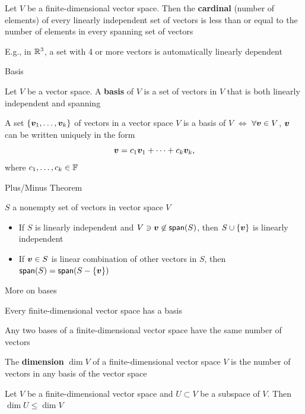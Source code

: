 \documentclass[aspectratio=169]{beamer}
\begin{document}
\begin{frame}
	\begin{theorem}
		Let $V$ be a finite-dimensional vector space. Then the \textbf{cardinal} (number of elements) of every linearly independent set of vectors is less than or equal to the number of elements in every spanning set of vectors
	\end{theorem}
\vfill
E.g., in $\mathbb{R}^3$, a set with 4 or more vectors is automatically linearly dependent
\end{frame}


\begin{frame}{Basis}
	\begin{definition}[Basis]
		Let $V$ be a vector space. A \textbf{basis} of $V$ is a set of vectors in $V$ that is both linearly independent and spanning
	\end{definition}
	\vfill
	\begin{theorem}
		A set $\{\bm{v}_1,\ldots,\bm{v}_k\}$ of vectors in a vector space $V$ is a basis of $V$ $\iff$ $\forall \bm{v}\in V$, $\bm{v}$ can be written uniquely in the form
		\[
		\bm{v}=c_1\bm{v}_1+\cdots+c_k\bm{v}_k,
		\]
		where $c_1,\ldots,c_k\in\mathbb{F}$
	\end{theorem}
\end{frame}

\begin{frame}{Plus/Minus Theorem}
	\begin{theorem}
		$S$ a nonempty set of vectors in vector space $V$
		\begin{itemize}
			\item If $S$ is linearly independent and $V\ni\bm{v}\not\in \mathsf{span}(S)$, then $S\cup\{\bm{v}\}$ is linearly independent
			\item If $\bm{v}\in S$ is linear combination of other vectors in $S$, then $\mathsf{span}(S)=\mathsf{span}(S-\{\bm{v}\})$
		\end{itemize}
	\end{theorem}
\end{frame}


\begin{frame}{More on bases}
	\begin{theorem}
	Every finite-dimensional vector space has a basis
	\end{theorem}
	\vfill
	\begin{importanttheorem}
		Any two bases of a finite-dimensional vector space have the same number of vectors
	\end{importanttheorem}
	\vfill
	\begin{definition}[Dimension]
		The \textbf{dimension} $\dim V$ of a finite-dimensional vector space $V$ is the number of vectors in any basis of the vector space
	\end{definition}
	\vfill
	\begin{theorem}
		Let $V$ be a finite-dimensional vector space and $U\subset V$ be a subspace of $V$. Then $\dim U\leq \dim V$
	\end{theorem}
\end{frame}
\end{document}
